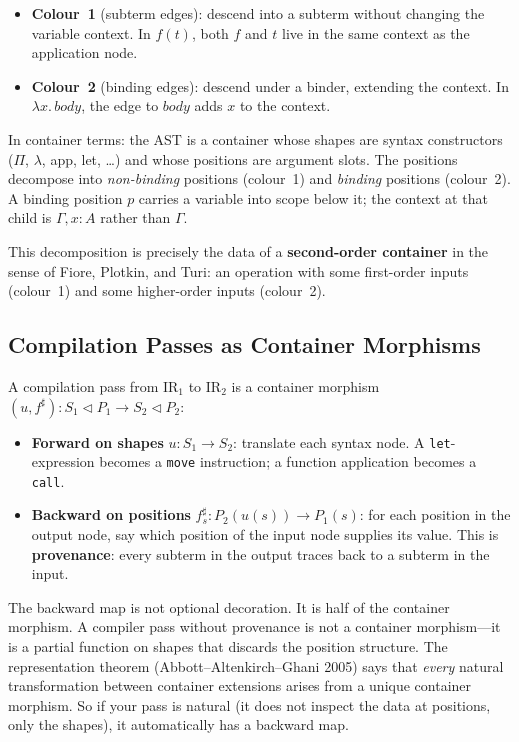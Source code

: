 \documentclass[11pt,a4paper]{article}
\theoremstyle{definition}
\theoremstyle{plain}
\newcommand{\cont}[2]{#1 \triangleleft #2}
\begin{document}
\begin{itemize}[nosep]
\item \textbf{Colour~1} (subterm edges): descend into a subterm without
  changing the variable context. In $f(t)$, both $f$ and $t$ live in the
  same context as the application node.
\item \textbf{Colour~2} (binding edges): descend under a binder, extending
  the context. In $\lambda x.\, \mathit{body}$, the edge to
  $\mathit{body}$ adds $x$ to the context.
\end{itemize}

In container terms: the AST is a container whose shapes are syntax
constructors ($\Pi$, $\lambda$, app, let, \ldots) and whose positions are
argument slots. The positions decompose into \emph{non-binding} positions
(colour~1) and \emph{binding} positions (colour~2). A binding position
$p$ carries a variable into scope below it; the context at that child is
$\Gamma, x : A$ rather than $\Gamma$.

This decomposition is precisely the data of a \textbf{second-order
container} in the sense of Fiore, Plotkin, and Turi: an operation with
some first-order inputs (colour~1) and some higher-order inputs (colour~2).

\subsection{Compilation Passes as Container Morphisms}

A compilation pass from IR$_1$ to IR$_2$ is a container morphism
$(u, f^\sharp) : \cont{S_1}{P_1} \to \cont{S_2}{P_2}$:
\begin{itemize}[nosep]
\item \textbf{Forward on shapes} $u : S_1 \to S_2$: translate each syntax
  node. A \texttt{let}-expression becomes a \texttt{move} instruction; a
  function application becomes a \texttt{call}.
\item \textbf{Backward on positions} $f^\sharp_s : P_2(u(s)) \to P_1(s)$:
  for each position in the output node, say which position of the input node
  supplies its value. This is \textbf{provenance}: every subterm in the output
  traces back to a subterm in the input.
\end{itemize}

The backward map is not optional decoration. It is half of the container
morphism. A compiler pass without provenance is not a container morphism---it
is a partial function on shapes that discards the position structure. The
representation theorem (Abbott--Altenkirch--Ghani 2005) says that
\emph{every} natural transformation between container extensions arises from
a unique container morphism. So if your pass is natural (it does not inspect
the data at positions, only the shapes), it automatically has a backward map.
\end{document}
